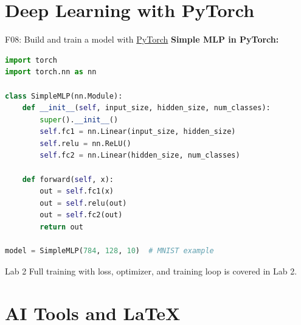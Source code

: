 \documentclass[aspectratio=169, 10pt]{beamer}
\begin{document}
\section{Deep Learning with PyTorch}

\begin{frame}[fragile]{F08: Build and train a model with \href{https://pytorch.org/}{PyTorch}}
    \textbf{Simple MLP in PyTorch:}
    \begin{lstlisting}[language=Python,basicstyle=\ttfamily\scriptsize]
import torch
import torch.nn as nn

class SimpleMLP(nn.Module):
    def __init__(self, input_size, hidden_size, num_classes):
        super().__init__()
        self.fc1 = nn.Linear(input_size, hidden_size)
        self.relu = nn.ReLU()
        self.fc2 = nn.Linear(hidden_size, num_classes)

    def forward(self, x):
        out = self.fc1(x)
        out = self.relu(out)
        out = self.fc2(out)
        return out

model = SimpleMLP(784, 128, 10)  # MNIST example
    \end{lstlisting}

    \begin{block}{\footnotesize Lab 2}
        \footnotesize Full training with loss, optimizer, and training loop is covered in Lab 2.
    \end{block}
\end{frame}

\section{AI Tools and LaTeX}
\end{document}
